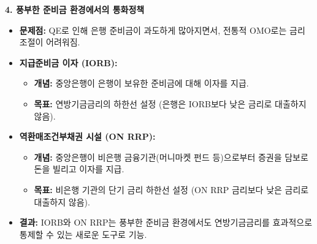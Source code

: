 \documentclass[11pt,a4paper]{article}
\begin{document}
\begin{tcolorbox}[summarybox, title=\textbf{중앙은행 통화정책 도구 요약}]
  \textbf{4. 풍부한 준비금 환경에서의 통화정책}
  \begin{itemize}
    \item \textbf{문제점:} QE로 인해 은행 준비금이 과도하게 많아지면서, 전통적 OMO로는 금리 조절이 어려워짐.
    \item \textbf{지급준비금 이자 (IORB):}
      \begin{itemize}
        \item \textbf{개념:} 중앙은행이 은행이 보유한 준비금에 대해 이자를 지급.
        \item \textbf{목표:} 연방기금금리의 하한선 설정 (은행은 IORB보다 낮은 금리로 대출하지 않음).
      \end{itemize}
    \item \textbf{역환매조건부채권 시설 (ON RRP):}
      \begin{itemize}
        \item \textbf{개념:} 중앙은행이 비은행 금융기관(머니마켓 펀드 등)으로부터 증권을 담보로 돈을 빌리고 이자를 지급.
        \item \textbf{목표:} 비은행 기관의 단기 금리 하한선 설정 (ON RRP 금리보다 낮은 금리로 대출하지 않음).
      \end{itemize}
    \item \textbf{결과:} IORB와 ON RRP는 풍부한 준비금 환경에서도 연방기금금리를 효과적으로 통제할 수 있는 새로운 도구로 기능.
  \end{itemize}
\end{tcolorbox}
\end{document}
